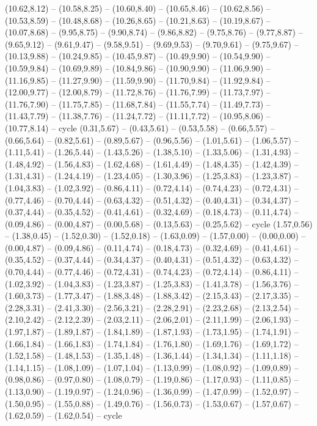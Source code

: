 \expandafter\def\csname geo:gebiet:1938-Lithuania\endcsname{
  (10.62,8.12) -- (10.58,8.25) -- (10.60,8.40) -- (10.65,8.46) -- (10.62,8.56) -- (10.53,8.59) -- (10.48,8.68) -- (10.26,8.65) -- (10.21,8.63) -- (10.19,8.67) -- (10.07,8.68) -- (9.95,8.75) -- (9.90,8.74) -- (9.86,8.82) -- (9.75,8.76) -- (9.77,8.87) -- (9.65,9.12) -- (9.61,9.47) -- (9.58,9.51) -- (9.69,9.53) -- (9.70,9.61) -- (9.75,9.67) -- (10.13,9.88) -- (10.24,9.85) -- (10.45,9.87) -- (10.49,9.90) -- (10.54,9.90) -- (10.59,9.84) -- (10.69,9.89) -- (10.84,9.86) -- (10.90,9.90) -- (11.06,9.90) -- (11.16,9.85) -- (11.27,9.90) -- (11.59,9.90) -- (11.70,9.84) -- (11.92,9.84) -- (12.00,9.77) -- (12.00,8.79) -- (11.72,8.76) -- (11.76,7.99) -- (11.73,7.97) -- (11.76,7.90) -- (11.75,7.85) -- (11.68,7.84) -- (11.55,7.74) -- (11.49,7.73) -- (11.43,7.79) -- (11.38,7.76) -- (11.24,7.72) -- (11.11,7.72) -- (10.95,8.06) -- (10.77,8.14) -- cycle}
\expandafter\def\csname geo:gebiet:1938-Belgium\endcsname{
  (0.31,5.67) -- (0.43,5.61) -- (0.53,5.58) -- (0.66,5.57) -- (0.66,5.64) -- (0.82,5.61) -- (0.89,5.67) -- (0.96,5.56) -- (1.01,5.61) -- (1.06,5.57) -- (1.11,5.41) -- (1.26,5.44) -- (1.43,5.26) -- (1.38,5.10) -- (1.33,5.06) -- (1.31,4.93) -- (1.48,4.92) -- (1.56,4.83) -- (1.62,4.68) -- (1.61,4.49) -- (1.48,4.35) -- (1.42,4.39) -- (1.31,4.31) -- (1.24,4.19) -- (1.23,4.05) -- (1.30,3.96) -- (1.25,3.83) -- (1.23,3.87) -- (1.04,3.83) -- (1.02,3.92) -- (0.86,4.11) -- (0.72,4.14) -- (0.74,4.23) -- (0.72,4.31) -- (0.77,4.46) -- (0.70,4.44) -- (0.63,4.32) -- (0.51,4.32) -- (0.40,4.31) -- (0.34,4.37) -- (0.37,4.44) -- (0.35,4.52) -- (0.41,4.61) -- (0.32,4.69) -- (0.18,4.73) -- (0.11,4.74) -- (0.09,4.86) -- (0.00,4.87) -- (0.00,5.68) -- (0.13,5.63) -- (0.25,5.62) -- cycle}
\expandafter\def\csname geo:gebiet:1938-France\endcsname{
  (1.57,0.56) -- (1.38,0.45) -- (1.52,0.30) -- (1.52,0.18) -- (1.63,0.09) -- (1.57,0.00) -- (0.00,0.00) -- (0.00,4.87) -- (0.09,4.86) -- (0.11,4.74) -- (0.18,4.73) -- (0.32,4.69) -- (0.41,4.61) -- (0.35,4.52) -- (0.37,4.44) -- (0.34,4.37) -- (0.40,4.31) -- (0.51,4.32) -- (0.63,4.32) -- (0.70,4.44) -- (0.77,4.46) -- (0.72,4.31) -- (0.74,4.23) -- (0.72,4.14) -- (0.86,4.11) -- (1.02,3.92) -- (1.04,3.83) -- (1.23,3.87) -- (1.25,3.83) -- (1.41,3.78) -- (1.56,3.76) -- (1.60,3.73) -- (1.77,3.47) -- (1.88,3.48) -- (1.88,3.42) -- (2.15,3.43) -- (2.17,3.35) -- (2.28,3.31) -- (2.41,3.30) -- (2.56,3.21) -- (2.28,2.91) -- (2.23,2.68) -- (2.13,2.54) -- (2.10,2.42) -- (2.12,2.39) -- (2.03,2.11) -- (2.06,2.01) -- (2.11,1.99) -- (2.06,1.93) -- (1.97,1.87) -- (1.89,1.87) -- (1.84,1.89) -- (1.87,1.93) -- (1.73,1.95) -- (1.74,1.91) -- (1.66,1.84) -- (1.66,1.83) -- (1.74,1.84) -- (1.76,1.80) -- (1.69,1.76) -- (1.69,1.72) -- (1.52,1.58) -- (1.48,1.53) -- (1.35,1.48) -- (1.36,1.44) -- (1.34,1.34) -- (1.11,1.18) -- (1.14,1.15) -- (1.08,1.09) -- (1.07,1.04) -- (1.13,0.99) -- (1.08,0.92) -- (1.09,0.89) -- (0.98,0.86) -- (0.97,0.80) -- (1.08,0.79) -- (1.19,0.86) -- (1.17,0.93) -- (1.11,0.85) -- (1.13,0.90) -- (1.19,0.97) -- (1.24,0.96) -- (1.36,0.99) -- (1.47,0.99) -- (1.52,0.97) -- (1.50,0.95) -- (1.55,0.88) -- (1.49,0.76) -- (1.56,0.73) -- (1.53,0.67) -- (1.57,0.67) -- (1.62,0.59) -- (1.62,0.54) -- cycle}
